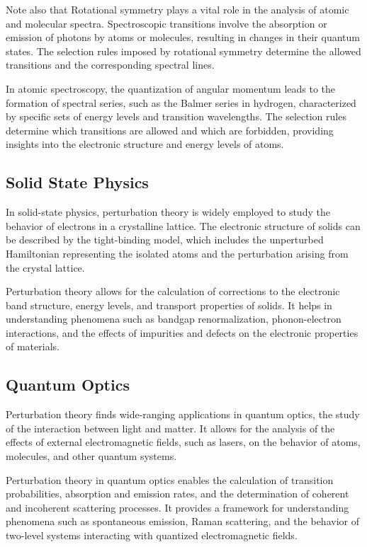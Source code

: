 \documentclass[a4paper,11pt]{article}
\begin{document}
Note also that Rotational symmetry plays a vital role in the analysis of atomic and molecular spectra. Spectroscopic transitions involve the absorption or emission of photons by atoms or molecules, resulting in changes in their quantum states. The selection rules imposed by rotational symmetry determine the allowed transitions and the corresponding spectral lines.

In atomic spectroscopy, the quantization of angular momentum leads to the formation of spectral series, such as the Balmer series in hydrogen, characterized by specific sets of energy levels and transition wavelengths. The selection rules determine which transitions are allowed and which are forbidden, providing insights into the electronic structure and energy levels of atoms.


\subsection{Solid State Physics}
In solid-state physics, perturbation theory is widely employed to study the behavior of electrons in a crystalline lattice. The electronic structure of solids can be described by the tight-binding model, which includes the unperturbed Hamiltonian representing the isolated atoms and the perturbation arising from the crystal lattice.

Perturbation theory allows for the calculation of corrections to the electronic band structure, energy levels, and transport properties of solids. It helps in understanding phenomena such as bandgap renormalization, phonon-electron interactions, and the effects of impurities and defects on the electronic properties of materials.

\subsection{Quantum Optics}
Perturbation theory finds wide-ranging applications in quantum optics, the study of the interaction between light and matter. It allows for the analysis of the effects of external electromagnetic fields, such as lasers, on the behavior of atoms, molecules, and other quantum systems.

Perturbation theory in quantum optics enables the calculation of transition probabilities, absorption and emission rates, and the determination of coherent and incoherent scattering processes. It provides a framework for understanding phenomena such as spontaneous emission, Raman scattering, and the behavior of two-level systems interacting with quantized electromagnetic fields.
\end{document}
